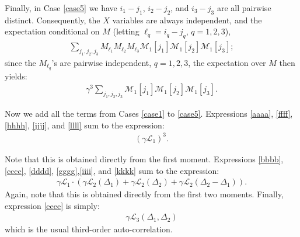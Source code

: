 \documentclass[12pt]{article}
\newcommand{\1}{\mathbf{1}}
\newcommand{\M}{\mathcal{M}}
\renewcommand{\L}{\mathcal{L}}
\theoremstyle{plain}
\theoremstyle{definition}
\theoremstyle{remark}
\theoremstyle{plain}
\theoremstyle{remark}
\theoremstyle{plain}
\theoremstyle{plain}
\theoremstyle{plain}
\numberwithin{equation}{section}
\begin{document}
Finally, in Case \ref{case5} we have $i_1 - j_1$, $i_2 - j_2$, and $i_3 - j_3$ are all pairwise distinct. Consequently, the $X$ variables are always independent, and the expectation conditional on $M$ (letting $\ell_q = i_q - j_q$, $q=1,2,3$),
%
\begin{align}
%
\sum_{j_1,j_2,j_3} M_{\ell_1} M_{\ell_2} M_{\ell_3} \M_1[j_1] \M_1[j_2] \M_1[j_3];
%
\end{align}
%
since the $M_{\ell_q}$'s are pairwise independent, $q=1,2,3$, the expectation over $M$ then yields:
%
\begin{align} \label{llll}
%
\gamma^3 \sum_{j_1,j_2,j_3} \M_1[j_1] \M_1[j_2] \M_1[j_3].
%
\end{align}

Now we add all the terms from Cases \ref{case1} to \ref{case5}. Expressions \eqref{aaaa}, \eqref{ffff}, \eqref{hhhh}, \eqref{jjjj}, and \eqref{llll} sum to the expression:
%
\begin{align}
%
(\gamma \L_1)^3.
%
\end{align}

Note that this is obtained directly from the first moment. Expressions \eqref{bbbb}, \eqref{cccc}, \eqref{dddd}, \eqref{gggg},\eqref{iiii}, and \eqref{kkkk} sum to the expression:
%
\begin{align}
%
\gamma \L_1  \cdot 
( \gamma\L_2(\Delta_1) + \gamma\L_2(\Delta_2) + \gamma\L_2(\Delta_2-\Delta_1)).
%
\end{align}
%
Again, note that this is obtained directly from the first two moments. Finally, expression \eqref{eeee} is simply:
%
\begin{align}
%
\gamma \L_3(\Delta_1,\Delta_2)
%
\end{align}
%
which is the usual third-order auto-correlation.
\end{document}
